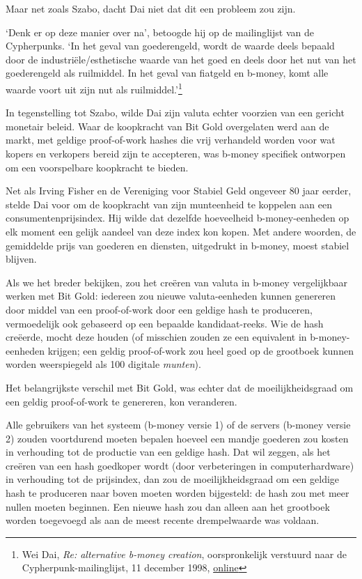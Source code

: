 \documentclass[
  a5paper,
  smalldemyvopaper,11pt,twoside,onecolumn,openright,extrafontsizes,
hidelinks]{memoir}
\begin{document}
Maar net zoals Szabo, dacht Dai niet dat dit een probleem zou zijn.

`Denk er op deze manier over na', betoogde hij op de mailinglijst van de
Cypherpunks. `In het geval van goederengeld, wordt de waarde deels
bepaald door de industriële/esthetische waarde van het goed en deels
door het nut van het goederengeld als ruilmiddel. In het geval van
fiatgeld en b-money, komt alle waarde voort uit zijn nut als
ruilmiddel.'\footnote{Wei Dai, \emph{Re: alternative b-money creation},
  oorspronkelijk verstuurd naar de Cypherpunk-mailinglijst, 11 december
  1998,
  \href{https://cypherpunks.venona.com/date/1998/12/msg00448.html}{online}}

In tegenstelling tot Szabo, wilde Dai zijn valuta echter voorzien van
een gericht monetair beleid. Waar de koopkracht van Bit Gold overgelaten
werd aan de markt, met geldige proof-of-work hashes die vrij verhandeld
worden voor wat kopers en verkopers bereid zijn te accepteren, was
b-money specifiek ontworpen om een voorspelbare koopkracht te bieden.

Net als Irving Fisher en de Vereniging voor Stabiel Geld ongeveer 80
jaar eerder, stelde Dai voor om de koopkracht van zijn munteenheid te
koppelen aan een consumentenprijsindex. Hij wilde dat dezelfde
hoeveelheid b-money-eenheden op elk moment een gelijk aandeel van deze
index kon kopen. Met andere woorden, de gemiddelde prijs van goederen en
diensten, uitgedrukt in b-money, moest stabiel blijven.

Als we het breder bekijken, zou het creëren van valuta in b-money
vergelijkbaar werken met Bit Gold: iedereen zou nieuwe valuta-eenheden
kunnen genereren door middel van een proof-of-work door een geldige hash
te produceren, vermoedelijk ook gebaseerd op een bepaalde
kandidaat-reeks. Wie de hash creëerde, mocht deze houden (of misschien
zouden ze een equivalent in b-money-eenheden krijgen; een geldig
proof-of-work zou heel goed op de grootboek kunnen worden weerspiegeld
als 100 digitale \emph{munten}).

Het belangrijkste verschil met Bit Gold, was echter dat de
moeilijkheidsgraad om een geldig proof-of-work te genereren, kon
veranderen.

Alle gebruikers van het systeem (b-money versie 1) of de servers
(b-money versie 2) zouden voortdurend moeten bepalen hoeveel een mandje
goederen zou kosten in verhouding tot de productie van een geldige hash.
Dat wil zeggen, als het creëren van een hash goedkoper wordt (door
verbeteringen in computerhardware) in verhouding tot de prijsindex, dan
zou de moeilijkheidsgraad om een geldige hash te produceren naar boven
moeten worden bijgesteld: de hash zou met meer nullen moeten beginnen.
Een nieuwe hash zou dan alleen aan het grootboek worden toegevoegd als
aan de meest recente drempelwaarde was voldaan.
\end{document}
